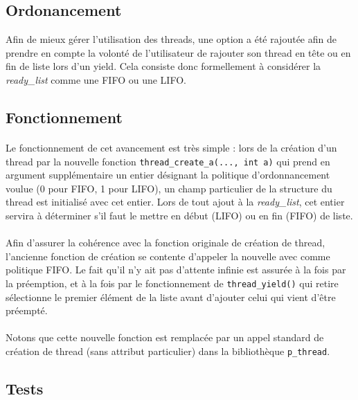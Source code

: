 \subsection{Ordonancement}

Afin de mieux gérer l'utilisation des threads, une option a été rajoutée afin de prendre en compte la volonté de l'utilisateur de rajouter son thread en tête ou en fin de liste lors d'un yield. Cela consiste donc formellement à considérer la \emph{ready\_list} comme une FIFO ou une LIFO.

\subsection{Fonctionnement}

\paragraph{}
Le fonctionnement de cet avancement est très simple : lors de la création d'un thread par la nouvelle fonction \texttt{thread\_create\_a(..., int a)} qui prend en argument supplémentaire un entier désignant la politique d'ordonnancement voulue (0 pour FIFO, 1 pour LIFO), un champ particulier de la structure du thread est initialisé avec cet entier. Lors de tout ajout à la \emph{ready\_list}, cet entier servira à déterminer s'il faut le mettre en début (LIFO) ou en fin (FIFO) de liste.

\paragraph{}
Afin d'assurer la cohérence avec la fonction originale de création de thread, l'ancienne fonction de création se contente d'appeler la nouvelle avec comme politique FIFO. Le fait qu'il n'y ait pas d'attente infinie est assurée à la fois par la préemption, et à la fois par le fonctionnement de \texttt{thread\_yield()} qui retire sélectionne le premier élément de la liste avant d'ajouter celui qui vient d'être préempté.

\paragraph{}
Notons que cette nouvelle fonction est remplacée par un appel standard de création de thread (sans attribut particulier) dans la bibliothèque \texttt{p\_thread}.

\subsection{Tests}

